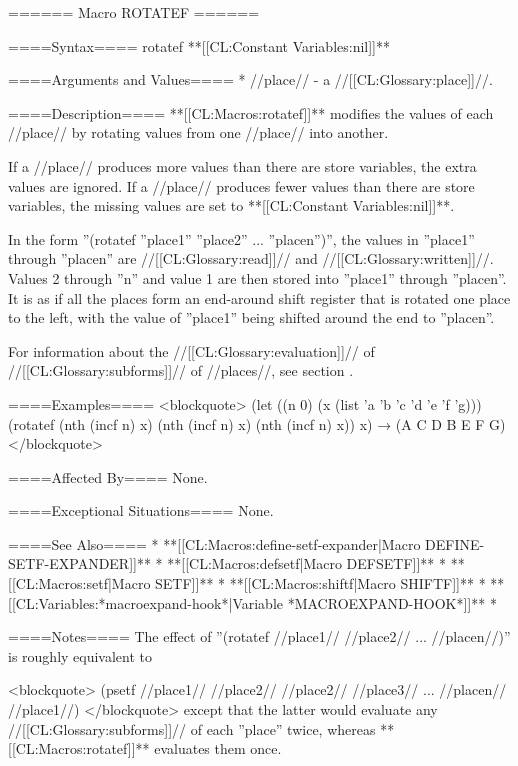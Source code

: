 ====== Macro ROTATEF ======

====Syntax====
\DefmacWithValues rotatef {} {**[[CL:Constant Variables:nil]]**}

====Arguments and Values====
  * //place// - a //[[CL:Glossary:place]]//.

====Description====
**[[CL:Macros:rotatef]]** modifies the values of each //place// by rotating values from one //place// into another.

If a //place// produces more values than there are store variables, the extra values are ignored. If a //place// produces fewer values than there are store variables, the missing values are set to **[[CL:Constant Variables:nil]]**.

In the form ''(rotatef ''place1'' ''place2'' ... ''placen'')'', the values in ''place1'' through ''placen'' are //[[CL:Glossary:read]]// and //[[CL:Glossary:written]]//. Values 2 through ''n'' and value 1 are then stored into ''place1'' through ''placen''. It is as if all the places form an end-around shift register that is rotated one place to the left, with the value of ''place1'' being shifted around the end to ''placen''.

For information about the //[[CL:Glossary:evaluation]]// of //[[CL:Glossary:subforms]]// of //places//, see section {\secref\GenRefSubFormEval}.


====Examples==== <blockquote> (let ((n 0) (x (list 'a 'b 'c 'd 'e 'f 'g))) (rotatef (nth (incf n) x) (nth (incf n) x) (nth (incf n) x)) x) → (A C D B E F G) </blockquote>

====Affected By====
None.

====Exceptional Situations====
None.

====See Also====
  * **[[CL:Macros:define-setf-expander|Macro DEFINE-SETF-EXPANDER]]**
  * **[[CL:Macros:defsetf|Macro DEFSETF]]**
  * **[[CL:Macros:setf|Macro SETF]]**
  * **[[CL:Macros:shiftf|Macro SHIFTF]]**
  * **[[CL:Variables:*macroexpand-hook*|Variable *MACROEXPAND-HOOK*]]**
  * {\secref\GeneralizedReference}

====Notes====
The effect of ''(rotatef //place1// //place2// ... //placen//)'' is roughly equivalent to

<blockquote> (psetf //place1// //place2// //place2// //place3// ... //placen// //place1//) </blockquote> except that the latter would evaluate any //[[CL:Glossary:subforms]]// of each ''place'' twice, whereas **[[CL:Macros:rotatef]]** evaluates them once.

 
